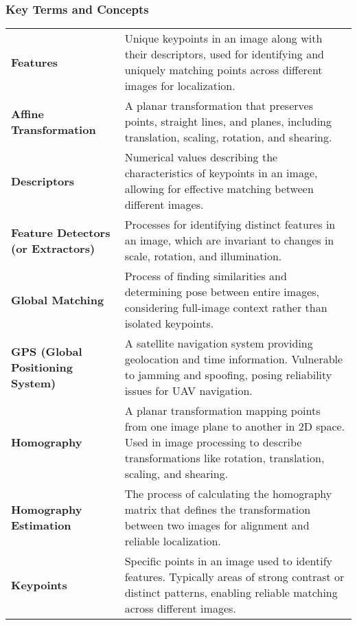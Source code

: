 \subsubsection*{Key Terms and Concepts}

\begingroup
\renewcommand{\arraystretch}{1.2}
\begin{tabularx}{\textwidth}{@{}p{2.5cm}L}

    \textbf{Features} & 
    Unique keypoints in an image along with their descriptors, used for identifying and uniquely matching points across different images for localization. \\
    
    \textbf{Affine Transformation} & 
    A planar transformation that preserves points, straight lines, and planes, including translation, scaling, rotation, and shearing. \\

    \textbf{Descriptors} & 
    Numerical values describing the characteristics of keypoints in an image, allowing for effective matching between different images. \\

    \textbf{Feature Detectors (or Extractors)} & 
    Processes for identifying distinct features in an image, which are invariant to changes in scale, rotation, and illumination. \\

    \textbf{Global Matching} & 
    Process of finding similarities and determining pose between entire images, considering full-image context rather than isolated keypoints. \\

    \textbf{GPS (Global Positioning System)} & 
    A satellite navigation system providing geolocation and time information. Vulnerable to jamming and spoofing, posing reliability issues for UAV navigation. \\

    \textbf{Homography} & 
    A planar transformation mapping points from one image plane to another in 2D space. Used in image processing to describe transformations like rotation, translation, scaling, and shearing. \\

    \textbf{Homography Estimation} & 
    The process of calculating the homography matrix that defines the transformation between two images for alignment and reliable localization. \\

    \textbf{Keypoints} & 
    Specific points in an image used to identify features. Typically areas of strong contrast or distinct patterns, enabling reliable matching across different images. \\


\end{tabularx}
